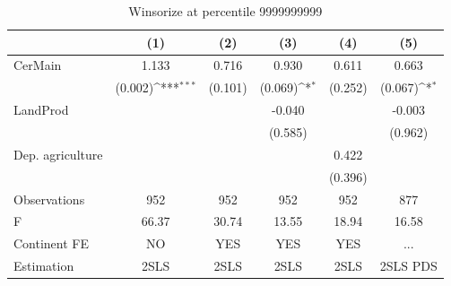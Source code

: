 \documentclass[12pt,a4paper]{article}
\begin{document}
\begin{table}[htbp]\centering
\def\sym#1{\ifmmode^{#1}\else\(^{#1}\)\fi}
\caption{Winsorize at percentile 9999999999}
\begin{tabular}{l*{5}{c}}
\hline\hline
                &\multicolumn{1}{c}{(1)}         &\multicolumn{1}{c}{(2)}         &\multicolumn{1}{c}{(3)}         &\multicolumn{1}{c}{(4)}         &\multicolumn{1}{c}{(5)}         \\
\hline
CerMain         &    1.133         &    0.716         &    0.930         &    0.611         &    0.663         \\
                &  (0.002)\sym{***}&  (0.101)         &  (0.069)\sym{*}  &  (0.252)         &  (0.067)\sym{*}  \\
LandProd        &                  &                  &   -0.040         &                  &   -0.003         \\
                &                  &                  &  (0.585)         &                  &  (0.962)         \\
Dep. agriculture&                  &                  &                  &    0.422         &                  \\
                &                  &                  &                  &  (0.396)         &                  \\
\hline
Observations    &      952         &      952         &      952         &      952         &      877         \\
F               &    66.37         &    30.74         &    13.55         &    18.94         &    16.58         \\
Continent FE    &       NO         &      YES         &      YES         &      YES         &      ...         \\
Estimation      &     2SLS         &     2SLS         &     2SLS         &     2SLS         & 2SLS PDS         \\
\hline\hline
\end{tabular}
\end{table}
\end{document}
